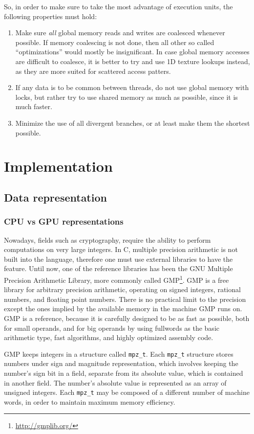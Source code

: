 \documentclass[12pt, a4paper]{report}
\begin{document}
\begin{sloppypar}
So, in order to make sure to take the most advantage of execution units, the
following properties must hold:

\begin{enumerate}
\item Make sure \emph{all} global memory reads and writes are coalesced whenever
possible.
If memory coalescing is not done, then all other so called ``optimizations''
would mostly be insignificant.
In case global memory accesses are difficult to coalesce, it is better to try
and use 1D texture lookups instead, as they are more suited for scattered access
patters.
\item If any data is to be common between threads, do not use global memory with
locks, but rather try to use shared memory as much as possible, since it is much
faster.
\item Minimize the use of all divergent branches, or at least make them the
shortest possible.
\end{enumerate}

\chapter{Implementation}
\section{Data representation}
\subsection{CPU vs GPU representations}
Nowadays, fields such as cryptography, require the ability to perform
computations on very large integers.
In C, multiple precision arithmetic is not built into the language, therefore
one must use external libraries to have the feature.
Until now, one of the reference libraries has been the GNU Multiple Precision
Arithmetic Library, more commonly called GMP\footnote{\url{http://gmplib.org/}}.
GMP is a free library for arbitrary precision arithmetic, operating on signed
integers, rational numbers, and floating point numbers.
There is no practical limit to the precision except the ones implied by the
available memory in the machine GMP runs on.
GMP is a reference, because it is carefully designed to be as fast as possible,
both for small operands, and for big operands by using fullwords as the basic
arithmetic type, fast algorithms, and highly optimized assembly code.

GMP keeps integers in a structure called \verb+mpz_t+.
Each \verb+mpz_t+ structure stores numbers under sign and magnitude
representation, which involves keeping the number's sign bit in a field,
separate from its absolute value, which is contained in another field.
The number's absolute value is represented as an array of unsigned integers.
Each \verb+mpz_t+ may be composed of a different number of machine words, in
order to maintain maximum memory efficiency.


\end{sloppypar}
\end{document}
